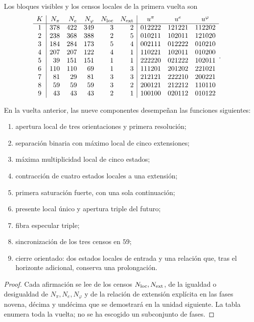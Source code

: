Los bloques visibles y los censos locales de la primera vuelta son
\[
\begin{array}{c|rrrrr|ccc}
K&N_\pi&N_e&N_\varphi&N_{\rm loc}&N_{\rm ext}
 &u^\pi&u^e&u^\varphi\\\hline
1&378&422&349&3&2&012222&121221&112202\\
2&238&368&388&2&5&010211&102011&121020\\
3&184&284&173&5&4&002111&012222&010210\\
4&207&207&122&4&1&110221&102011&010200\\
5&39&151&151&1&1&222220&021222&102011\\
6&110&110&69&1&3&111201&201202&221021\\
7&81&29&81&3&3&212121&222210&200221\\
8&59&59&59&3&2&200121&212212&110110\\
9&43&43&43&2&1&100100&020112&010122
\end{array}.
\]

\begin{theorem}
\label{p12-83-c7-s1:thm:funciones-nueve-componentes}
En la vuelta anterior, las nueve componentes desempeñan las funciones
siguientes:
\begin{enumerate}
 \item apertura local de tres orientaciones y primera resolución;
 \item separación binaria con máximo local de cinco extensiones;
 \item máxima multiplicidad local de cinco estados;
 \item contracción de cuatro estados locales a una extensión;
 \item primera saturación fuerte, con una sola continuación;
 \item presente local único y apertura triple del futuro;
 \item fibra especular triple;
 \item sincronización de los tres censos en \(59\);
 \item cierre orientado: dos estados locales de entrada y una relación que,
       tras el horizonte adicional, conserva una prolongación.
\end{enumerate}
\end{theorem}

\begin{proof}
Cada afirmación se lee de los censos \(N_{\rm loc},N_{\rm ext}\), de la
igualdad o desigualdad de \(N_\pi,N_e,N_\varphi\) y de la relación de
extensión explícita en las fases novena, décima y undécima que se demostrará
en la unidad siguiente. La tabla enumera toda la vuelta; no se ha escogido
un subconjunto de fases.
\end{proof}

